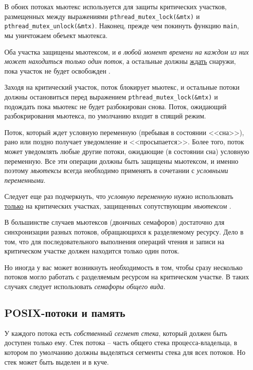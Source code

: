 \documentclass[%
	11pt,
	a4paper,
	utf8,
		]{article}
\begin{document}
В обоих потоках мьютекс используется для защиты критических участков, размещенных между выражениями \verb|pthread_mutex_lock(&mtx)| и \verb|pthread_mutex_unlock(&mtx)|. Наконец, прежде чем покинуть функцию \verb|main|, мы уничтожаем обеъект мьютекса.

Оба участка защищены мьютексом, и \emph{в любой момент времени на каждом из них может находиться только один поток}, а остальные должны \underline{ждать} снаружи, пока участок не будет освобожден \cite[]{amini-extreme-c:2022}.

Заходя на критический участок, поток блокирует мьютекс, и остальные потоки должны остановиться перед выражением \verb|pthread_mutex_lock(&mtx)| и подождать пока мьютекс не будет разбокирован снова. Поток, ожидающий разбокрирования мьютекса, по умолчанию входит в спящий режим.

Поток, который ждет условную переменную (пребывая в состоянии <<сна>>), рано или поздно получает уведомление и <<просыпается>>. Более того, поток может уведомлять любые другие потоки, ожидающие (в состоянии сна) условную переменную. Все эти операции должны быть защищены мьютексом, и именно поэтому {\color{blue}\emph{мьютексы} всегда необходимо применять в сочетании с \emph{условными переменными}}.

Следует еще раз подчеркнуть, что \emph{условную переменную} нужно использовать \underline{только} на критических участках, защищенных сопутствующим \emph{мьютексом} \cite[]{amini-extreme-c:2022}.

В большинстве случаев мьютексов (двоичных семафоров) достаточно для синхронизации разных потоков, обращающихся к разделяемому ресурсу. Дело в том, что для последовательного выполнения операций чтения и записи на критическом участке должен находится только один поток.

Но иногда у вас может возникнуть необходимость в том, чтобы сразу несколько потоков могло работать с разделяемым ресурсом на критическом участке. В таких случаях следует использовать \emph{семафоры общего вида}.

\subsection{POSIX-потоки и память}

У каждого потока есть \emph{собственный сегмент стека}, который должен быть доступен только ему. Стек потока -- часть общего стека процесса-владельца, в котором по умолчанию должны выделяться сегменты стека для всех потоков. Но стек может быть выделен и в куче.
\end{document}
